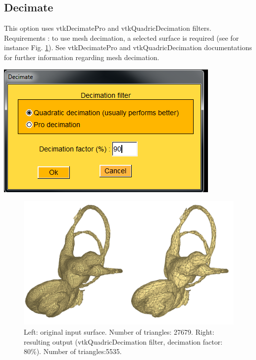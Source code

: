 \subsection{Decimate}
\noindent
\begin{minipage}{0.5\textwidth}


This option uses vtkDecimatePro and vtkQuadricDecimation filters. Requirements : to use mesh decimation, a selected
surface is required (see for instance Fig. \ref{decimate}). See vtkDecimatePro and vtkQuadricDecimation documentations for further information regarding
mesh decimation.

\end{minipage}    
\begin{minipage}{0.5\textwidth}\centering
  \includegraphics[scale=0.5]{images/Edit_selected_objects/07_decimate.png}
 \end{minipage} 
\noindent

\begin{figure}
  \centering
  \includegraphics[scale=0.3]{images/Edit_selected_objects/07_decimate_input_output.png} 
	\caption{Left: original input surface. Number of triangles: 27679. Right: resulting output (vtkQuadricDecimation filter,
decimation factor: 80\%). Number of triangles:5535.
}
\label{decimate}
 
\end{figure}




